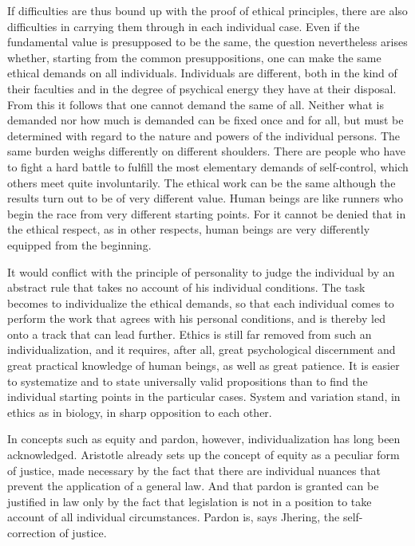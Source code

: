 \documentclass[12pt]{article}
\newcommand{\opage}[1]{\marginnote{\footnotesize\textit{[#1]}}}
\begin{document}
If difficulties are thus bound up with the proof of ethical principles, there
are also difficulties in carrying them through in each individual case. Even if
the fundamental value is presupposed to be the same, the question nevertheless
arises whether, starting from the common presuppositions, one can make the same
ethical demands on all individuals. Individuals are different, both in the kind
of their faculties and in the degree of psychical energy they have at their
disposal. From this it follows that one cannot demand the same of all. Neither
what is demanded nor how much is demanded can be fixed once and for all, but must
be determined with regard to the nature and powers of the individual persons.
The same burden weighs differently on different shoulders. There are people who
have to fight a hard battle to fulfill the most elementary demands of
self-control, which others meet quite involuntarily. The ethical work can be the
same although the results turn out to be of very different value. Human beings
are like runners who begin the race from very different starting points.
\opage{57}%
For it cannot be denied that in the ethical respect, as in other respects, human
beings are very differently equipped from the beginning.

It would conflict with the principle of personality to judge the individual by
an abstract rule that takes no account of his individual conditions. The task
becomes to individualize the ethical demands, so that each individual comes to
perform the work that agrees with his personal conditions, and is thereby led
onto a track that can lead further. Ethics is still far removed from such an
individualization, and it requires, after all, great psychological discernment
and great practical knowledge of human beings, as well as great patience. It is
easier to systematize and to state universally valid propositions than to find
the individual starting points in the particular cases. System and variation
stand, in ethics as in biology, in sharp opposition to each other.

In concepts such as equity and pardon, however, individualization has long been
acknowledged. Aristotle already sets up the concept of equity as a peculiar form
of justice, made
\opage{58}%
necessary by the fact that there are individual nuances that prevent the
application of a general law. And that pardon is granted can be justified in law
only by the fact that legislation is not in a position to take account of all
individual circumstances. Pardon is, says Jhering, the self-correction of
justice.
\end{document}
